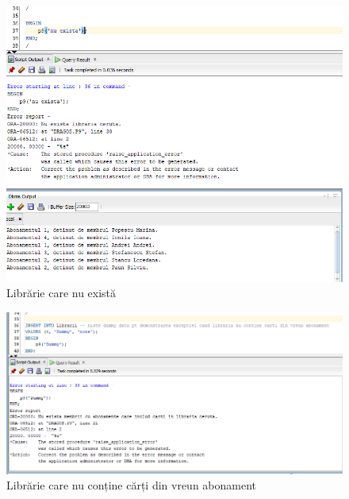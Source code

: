\documentclass[12pt]{article}
\begin{document}
\begin{figure}[!htb]
\includegraphics[max width=\linewidth]{imgs/ex9_2.png}
\caption{Librărie care nu există}
\label{fig:ex9_2}
\end{figure}
\begin{figure}[!htb]
\includegraphics[max width=\linewidth]{imgs/ex9_3.png}
\caption{Librărie care nu conține cărți din vreun abonament}
\label{fig:ex9_3}
\end{figure}
\end{document}
